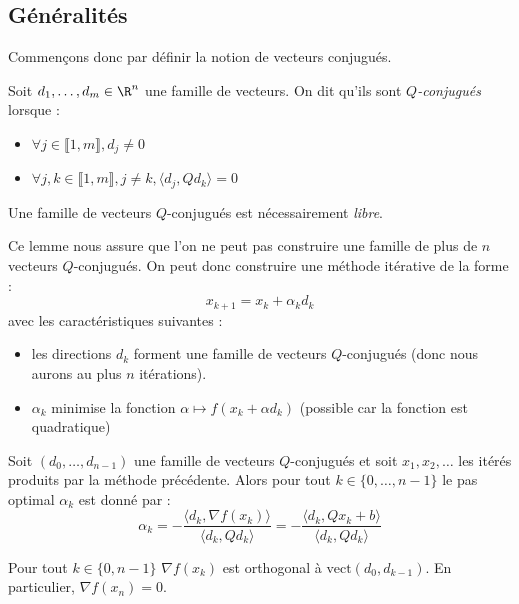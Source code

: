 \subsection{Généralités}

Commençons donc par définir la notion de vecteurs conjugués. 

\begin{definition}
    Soit $d_1, \dots, d_m \in \R^n$ une famille de vecteurs. On dit qu'ils sont \emph{$Q$-conjugués} lorsque : 
    \begin{itemize} 
        \item $ \forall j \in \llbracket 1, m \rrbracket, d_j \not = 0 $ 
        \item $ \forall j,k \in \llbracket 1,m \rrbracket , j \not = k , \langle d_j, Q d_k \rangle = 0 $ 
    \end{itemize}
\end{definition}

\begin{lemma}
    Une famille de vecteurs $Q$-conjugués est nécessairement \emph{libre}. 
\end{lemma}

Ce lemme nous assure que l'on ne peut pas construire une famille de plus de $n$ vecteurs $Q$-conjugués. On peut donc 
construire une méthode itérative de la forme : 
    $$ x_{k+1} = x_k + \alpha_k d_k $$ 
avec les caractéristiques suivantes : 
\begin{itemize} 
    \item les directions $d_k$ forment une famille de vecteurs $Q$-conjugués (donc nous aurons au plus $n$ itérations). 
    \item $ \alpha_k$ minimise la fonction $ \alpha \longmapsto  f(x_k + \alpha d_k)$ (possible car la fonction est quadratique)
\end{itemize}

\begin{lemma}
    Soit $(d_0, \dots, d_{n-1})$ une famille de vecteurs $Q$-conjugués et soit $x_1, x_2, \dots$ les itérés 
    produits par la méthode précédente. Alors pour tout $ k \in \{0, \dots, n-1\}$ le pas optimal 
    $ \alpha_k$ est donné par : 
        $$ \alpha_k = - \frac{ \langle d_k, \nabla f(x_k) \rangle }{ \langle d_k, Q d_k \rangle } = - \frac{ \langle d_k, Q x_k + b \rangle }{ \langle d_k, Q d_k \rangle }  $$
\end{lemma}

\begin{lemma}[Fondamental]
    Pour tout $ k \in \{0, n-1\}$ $ \nabla f(x_k)$ est orthogonal à $ \text{vect}(d_0, d_{k-1})$. En particulier, 
    $ \nabla f(x_n) = 0$. 
\end{lemma}

